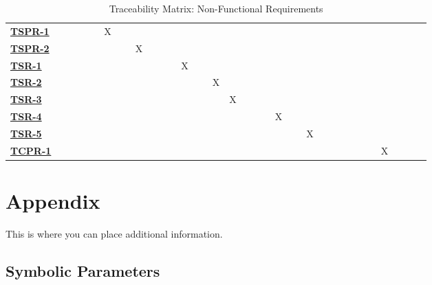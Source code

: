 \documentclass[12pt, titlepage]{article}
\begin{document}
\begin{landscape}
\begin{table}
\begin{adjustbox}{width=1.2\textwidth}
\begin{tabular}{l|ccccccccccccccccccccccccc}
        \hyperref[TSPR-1]{\textbf{TSPR-1}}  & ~ & ~ & ~ & X & ~ & ~ & ~ & ~ & ~ & ~ & ~ & ~ & ~ & ~ & ~ & ~ & ~ & ~ & ~ & ~ & ~ & ~ & ~\\
        \hyperref[TSPR-2]{\textbf{TSPR-2}}    & ~ & ~ & ~ & ~ & ~ & X & ~ & ~ & ~ & ~ & ~ & ~ & ~ & ~ & ~ & ~ & ~ & ~ & ~ & ~ & ~ & ~ & ~\\
        \hyperref[TSR-1]{\textbf{TSR-1}}  & ~ & ~ & ~ & ~ & ~ & ~ & ~ & ~ & X & ~ & ~ & ~ & ~ & ~ & ~ & ~ & ~ & ~ & ~ & ~ & ~ & ~ & ~\\
        \hyperref[TSR-2]{\textbf{TSR-2}}  & ~ & ~ & ~ & ~ & ~ & ~ & ~ & ~ & ~ & ~ & X & ~ & ~ & ~ & ~ & ~ & ~ & ~ & ~ & ~ & ~ & ~ & ~\\
        \hyperref[TSR-3]{\textbf{TSR-3}}  & ~ & ~ & ~ & ~ & ~ & ~ & ~ & ~ & ~ & ~ & ~ & X & ~ & ~ & ~ & ~ & ~ & ~ & ~ & ~ & ~ & ~ & ~\\
        \hyperref[TSR-4]{\textbf{TSR-4}}  & ~ & ~ & ~ & ~ & ~ & ~ & ~ & ~ & ~ & ~ & ~ & ~ & ~ & ~ & X & ~ & ~ & ~ & ~ & ~ & ~ & ~ & ~\\
        \hyperref[TSR-5]{\textbf{TSR-5}}  & ~ & ~ & ~ & ~ & ~ & ~ & ~ & ~ & ~ & ~ & ~ & ~ & ~ & ~ & ~ & ~ & X & ~ & ~ & ~ & ~ & ~ & ~\\
        \hyperref[TCPR-1]{\textbf{TCPR-1}}  & ~ & ~ & ~ & ~ & ~ & ~ & ~ & ~ & ~ & ~ & ~ & ~ & ~ & ~ & ~ & ~ & ~ & ~ & ~ & ~ & ~ &  X\\
    \end{tabular}
    \end{adjustbox}
    \caption{Traceability Matrix: Non-Functional Requirements}
    \label{Traceability Matrix: Non-Functional Requirements}
\end{table}
\end{landscape}
\pagestyle{plain}%
\clearpage

				




\newpage

\section{Appendix}

This is where you can place additional information.

\subsection{Symbolic Parameters}
\end{document}

